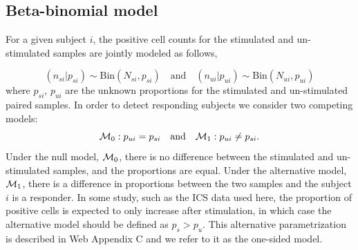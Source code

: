 \documentclass[useAMS,referee,usenatbib]{biom}
\begin{document}
\subsection{Beta-binomial model}
\label{s:DE}
For a given subject $i$, the positive cell counts for the stimulated and un-stimulated samples are jointly modeled as follows,

\begin{equation*}
(n_{si}|p_{si}) \sim \mathrm{Bin}(N_{si},p_{si})\quad \text{and}\quad (n_{ui}|p_{ui}) \sim \mathrm{Bin}(N_{ui},p_{ui})\label{eq:bino_likelihood}
\end{equation*}
where $p_{si}$, $p_{ui}$ are the unknown proportions for the stimulated and un-stimulated paired samples. In order to detect responding subjects we consider two competing models:
\begin{equation*}
{\cal M}_0: p_{ui}=p_{si}\quad \text{and}\quad {\cal M}_1: p_{ui}\ne p_{si}. \label{eq:models}
\end{equation*}
Under the null model, ${\cal M}_0$, there is no difference between the stimulated and un-stimulated samples, and the proportions are equal. Under the alternative model, ${\cal M}_1$, there is a difference in proportions between the two samples and the subject $i$ is a responder. In some study, such as the ICS data used here, the proportion of positive cells is expected to only increase after stimulation, in which case the alternative model should be defined as $p_s>p_u$. This alternative parametrization is described in Web Appendix C and we refer to it as the one-sided model.
\end{document}
